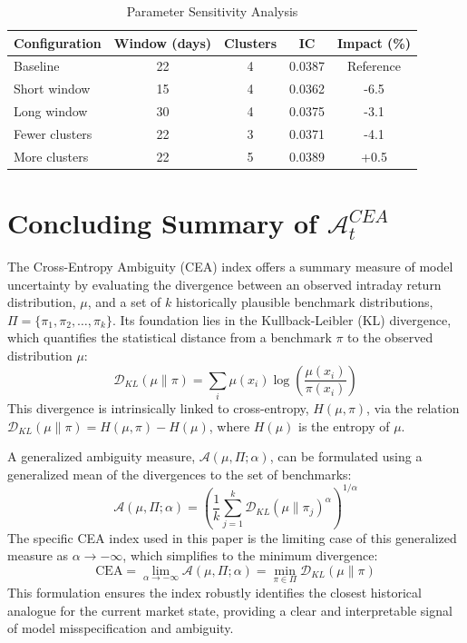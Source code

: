 \documentclass[preprint,12pt,authoryear]{elsarticle}
\begin{document}
\begin{table}[h]
\centering
\caption{Parameter Sensitivity Analysis}
\begin{tabularx}{\textwidth}{lcccc}
\toprule
\textbf{Configuration} & \textbf{Window (days)} & \textbf{Clusters} & \textbf{IC} & \textbf{Impact (\%)} \\
\midrule
Baseline & 22 & 4 & 0.0387 & Reference \\
Short window & 15 & 4 & 0.0362 & -6.5 \\
Long window & 30 & 4 & 0.0375 & -3.1 \\
Fewer clusters & 22 & 3 & 0.0371 & -4.1 \\
More clusters & 22 & 5 & 0.0389 & +0.5 \\
\bottomrule
\end{tabularx}
\end{table}

\section{Concluding Summary of $\mathcal{A}^{CEA}_t$}

\renewcommand{\theequation}{C.\arabic{equation}}
\setcounter{equation}{0}
\renewcommand{\thetable}{C.\arabic{table}}
\setcounter{table}{0}
\renewcommand{\thefigure}{C.\arabic{figure}}
\setcounter{figure}{0}

The Cross-Entropy Ambiguity (CEA) index offers a summary measure of model uncertainty by evaluating the divergence between an observed intraday return distribution, $\mu$, and a set of $k$ historically plausible benchmark distributions, $\Pi = \{\pi_1, \pi_2, \dots, \pi_k\}$. Its foundation lies in the Kullback-Leibler (KL) divergence, which quantifies the statistical distance from a benchmark $\pi$ to the observed distribution $\mu$:
\begin{equation}
    \mathcal{D}_{KL}(\mu \| \pi) = \sum_{i} \mu(x_i) \log\left(\frac{\mu(x_i)}{\pi(x_i)}\right)
\end{equation}
This divergence is intrinsically linked to cross-entropy, $H(\mu, \pi)$, via the relation $\mathcal{D}_{KL}(\mu \| \pi) = H(\mu, \pi) - H(\mu)$, where $H(\mu)$ is the entropy of $\mu$.

A generalized ambiguity measure, $\mathcal{A}(\mu, \Pi; \alpha)$, can be formulated using a generalized mean of the divergences to the set of benchmarks:
\begin{equation}
    \mathcal{A}(\mu, \Pi; \alpha) = \left( \frac{1}{k} \sum_{j=1}^{k} \mathcal{D}_{KL}(\mu \| \pi_j)^{\alpha} \right)^{1/\alpha}
\end{equation}
The specific CEA index used in this paper is the limiting case of this generalized measure as $\alpha \to -\infty$, which simplifies to the minimum divergence:
\begin{equation}
    \text{CEA} = \lim_{\alpha \to -\infty} \mathcal{A}(\mu, \Pi; \alpha) = \min_{\pi \in \Pi} \mathcal{D}_{KL}(\mu \| \pi)
\end{equation}
This formulation ensures the index robustly identifies the closest historical analogue for the current market state, providing a clear and interpretable signal of model misspecification and ambiguity.
\end{document}
